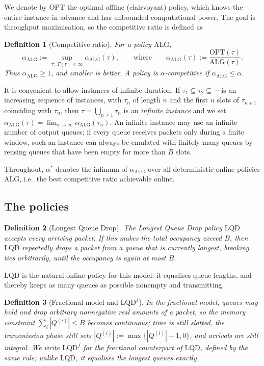 \documentclass[10pt]{article}
\newtheorem{definition}{Definition}
\newcommand{\LQD}{\text{LQD}}
\newcommand{\LQDf}{\text{LQD}^{f}}
\newcommand{\ALG}{\text{ALG}}
\newcommand{\OPT}{\text{OPT}}
\begin{document}
We denote by $\OPT$ the optimal offline (clairvoyant) policy, which knows the
entire instance in advance and has unbounded computational power. The goal is
throughput maximisation, so the competitive ratio is defined as

\begin{definition}[Competitive ratio]
For a policy $\ALG$,
\[
\alpha_{\ALG}
:=\sup_{\tau\,:\,T(\tau)<\infty}\alpha_{\ALG}(\tau),
\qquad\text{where}\qquad
\alpha_{\ALG}(\tau):=\frac{\OPT(\tau)}{\ALG(\tau)} .
\]
Thus $\alpha_{\ALG}\ge 1$, and smaller is better. A policy is
\emph{$\alpha$-competitive} if $\alpha_{\ALG}\le\alpha$.
\end{definition}

It is convenient to allow instances of infinite duration. If
$\tau_1\subseteq\tau_2\subseteq\cdots$ is an increasing sequence of instances,
with $\tau_n$ of length $n$ and the first $n$ slots of $\tau_{n+1}$ coinciding
with $\tau_n$, then $\tau=\bigcup_{n\ge 1}\tau_n$ is an \emph{infinite
instance} and we set
$\alpha_{\ALG}(\tau)=\lim_{n\to\infty}\alpha_{\ALG}(\tau_n)$. An infinite
instance may use an infinite number of output queues; if every queue receives
packets only during a finite window, such an instance can always be emulated
with finitely many queues by reusing queues that have been empty for more than
$B$ slots.

Throughout, $\alpha^{*}$ denotes the infimum of $\alpha_{\ALG}$ over all
deterministic online policies $\ALG$, i.e.\ the best competitive ratio
achievable online.

\subsection{The policies}

\begin{definition}[Longest Queue Drop]
The \emph{Longest Queue Drop} policy $\LQD$ accepts every arriving packet. If
this makes the total occupancy exceed $B$, then $\LQD$ repeatedly drops a
packet from a queue that is currently longest, breaking ties arbitrarily, until
the occupancy is again at most $B$.
\end{definition}

$\LQD$ is the natural online policy for this model: it equalises queue lengths,
and thereby keeps as many queues as possible nonempty and transmitting.

\begin{definition}[Fractional model and $\LQDf$]
In the \emph{fractional} model, queues may hold and drop arbitrary nonnegative
real amounts of a packet, so the memory constraint
$\sum_i|Q^{(i)}|\le B$ becomes continuous; time is still slotted, the
transmission phase still sets $|Q^{(i)}|:=\max\{|Q^{(i)}|-1,0\}$, and arrivals
are still integral. We write $\LQDf$ for the fractional counterpart of $\LQD$,
defined by the same rule; unlike $\LQD$, it equalises the longest queues
exactly.
\end{definition}
\end{document}
